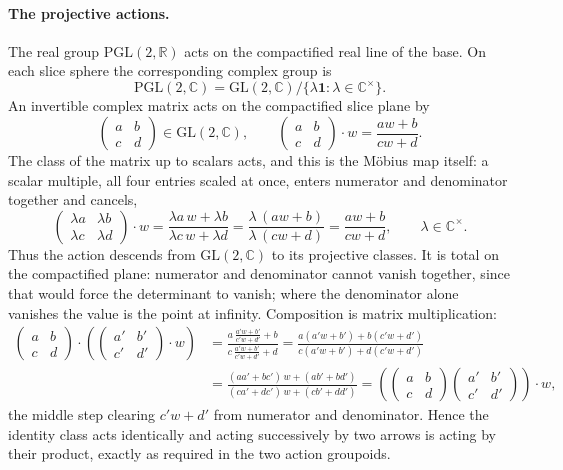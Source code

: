 \documentclass[11pt]{article}
\newcommand{\CC}{\mathbb{C}}
\newcommand{\RR}{\mathbb{R}}
\theoremstyle{plain}
\theoremstyle{definition}
\theoremstyle{remark}
\begin{document}
\paragraph{The projective actions.}
The real group $\mathrm{PGL}(2,\RR)$ acts on the compactified real line of
the base.  On each slice sphere the corresponding complex group is
\[
 \mathrm{PGL}(2,\CC)
 =\mathrm{GL}(2,\CC)
   \big/\{\lambda\mathbf 1:\lambda\in\CC^\times\}.
\]
An invertible complex matrix acts on the compactified slice plane by
\[
  \begin{pmatrix}a&b\\[2pt]c&d\end{pmatrix}\in\mathrm{GL}(2,\CC),
  \qquad
  \begin{pmatrix}a&b\\[2pt]c&d\end{pmatrix}\cdot w=\frac{aw+b}{cw+d}.
\]
The class of the matrix up to scalars acts, and this is the M\"obius
map itself: a scalar multiple, all four entries scaled at once, enters
numerator and denominator together and cancels,
\[
  \begin{pmatrix}\lambda a&\lambda b\\[2pt]\lambda c&\lambda d\end{pmatrix}\cdot w
    =\frac{\lambda a\,w+\lambda b}{\lambda c\,w+\lambda d}
    =\frac{\lambda\,(aw+b)}{\lambda\,(cw+d)}
    =\frac{aw+b}{cw+d},\qquad\lambda\in\CC^{\times}.
\]
Thus the action descends from $\mathrm{GL}(2,\CC)$ to its projective
classes.  It is total on the compactified plane: numerator and denominator
cannot vanish together, since that would force the determinant to vanish;
where the denominator alone vanishes the value is the point at infinity.
Composition is matrix multiplication:
\[
\begin{aligned}
  \begin{pmatrix}a&b\\[2pt]c&d\end{pmatrix}\cdot
  \left(\begin{pmatrix}a'&b'\\[2pt]c'&d'\end{pmatrix}\cdot w\right)
  &=\frac{a\,\frac{a'w+b'}{c'w+d'}+b}{c\,\frac{a'w+b'}{c'w+d'}+d}
   =\frac{a(a'w+b')+b(c'w+d')}{c(a'w+b')+d(c'w+d')}\\[2pt]
  &=\frac{(aa'+bc')\,w+(ab'+bd')}{(ca'+dc')\,w+(cb'+dd')}
   =\left(\begin{pmatrix}a&b\\[2pt]c&d\end{pmatrix}
   \begin{pmatrix}a'&b'\\[2pt]c'&d'\end{pmatrix}\right)\cdot w,
\end{aligned}
\]
the middle step clearing $c'w+d'$ from numerator and denominator.  Hence the
identity class acts identically and acting successively by two arrows is
acting by their product, exactly as required in the two action groupoids.
\end{document}
